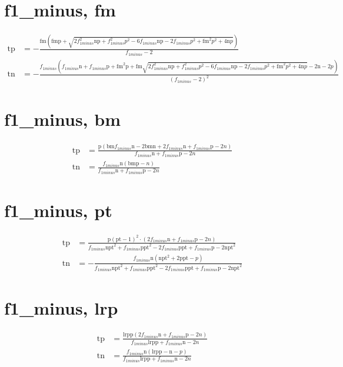 \documentclass[3p,times]{elsarticle}
\begin{document}
\begin{footnotesize}
\begin{landscape}
\section{f1_minus, fm}
\begin{align}
\mathrm{tp} &= - \frac{\mathrm{fm} \left(\mathrm{fm} \mathrm{p} + \sqrt{2 f_{1 minus}^{2} \mathrm{n} \mathrm{p} + f_{1 minus}^{2} p^{2} - 6 f_{1 minus} \mathrm{n} \mathrm{p} - 2 f_{1 minus} p^{2} + \mathrm{fm}^{2} p^{2} + 4 \mathrm{n} p}\right)}{f_{1 minus} - 2}\\
\mathrm{tn} &= - \frac{f_{1 minus} \left(f_{1 minus} \mathrm{n} + f_{1 minus} \mathrm{p} + \mathrm{fm}^{2} \mathrm{p} + \mathrm{fm} \sqrt{2 f_{1 minus}^{2} \mathrm{n} \mathrm{p} + f_{1 minus}^{2} p^{2} - 6 f_{1 minus} \mathrm{n} \mathrm{p} - 2 f_{1 minus} p^{2} + \mathrm{fm}^{2} p^{2} + 4 \mathrm{n} p} - 2 \mathrm{n} - 2 p\right)}{\left(f_{1 minus} - 2\right)^{2}}
\end{align}
\section{f1_minus, bm}
\begin{align}
\mathrm{tp} &= \frac{\mathrm{p} \left(\mathrm{bm} f_{1 minus} \mathrm{n} - 2 \mathrm{bm} \mathrm{n} + 2 f_{1 minus} \mathrm{n} + f_{1 minus} \mathrm{p} - 2 n\right)}{f_{1 minus} \mathrm{n} + f_{1 minus} \mathrm{p} - 2 n}\\
\mathrm{tn} &= \frac{f_{1 minus} \mathrm{n} \left(\mathrm{bm} \mathrm{p} - n\right)}{f_{1 minus} \mathrm{n} + f_{1 minus} \mathrm{p} - 2 n}
\end{align}
\section{f1_minus, pt}
\begin{align}
\mathrm{tp} &= \frac{\mathrm{p} \left(\mathrm{pt} - 1\right)^{2} \cdot \left(2 f_{1 minus} \mathrm{n} + f_{1 minus} \mathrm{p} - 2 n\right)}{f_{1 minus} \mathrm{n} \mathrm{pt}^{2} + f_{1 minus} \mathrm{p} \mathrm{pt}^{2} - 2 f_{1 minus} \mathrm{p} \mathrm{pt} + f_{1 minus} \mathrm{p} - 2 \mathrm{n} \mathrm{pt}^{2}}\\
\mathrm{tn} &= - \frac{f_{1 minus} \mathrm{n} \left(\mathrm{n} \mathrm{pt}^{2} + 2 \mathrm{p} \mathrm{pt} - p\right)}{f_{1 minus} \mathrm{n} \mathrm{pt}^{2} + f_{1 minus} \mathrm{p} \mathrm{pt}^{2} - 2 f_{1 minus} \mathrm{p} \mathrm{pt} + f_{1 minus} \mathrm{p} - 2 \mathrm{n} \mathrm{pt}^{2}}
\end{align}
\section{f1_minus, lrp}
\begin{align}
\mathrm{tp} &= \frac{\mathrm{lrp} \mathrm{p} \left(2 f_{1 minus} \mathrm{n} + f_{1 minus} \mathrm{p} - 2 n\right)}{f_{1 minus} \mathrm{lrp} \mathrm{p} + f_{1 minus} \mathrm{n} - 2 n}\\
\mathrm{tn} &= \frac{f_{1 minus} \mathrm{n} \left(\mathrm{lrp} \mathrm{p} - \mathrm{n} - p\right)}{f_{1 minus} \mathrm{lrp} \mathrm{p} + f_{1 minus} \mathrm{n} - 2 n}
\end{align}

\end{landscape}
\end{footnotesize}
\end{document}
